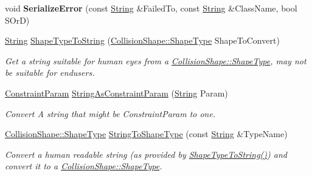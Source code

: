 \begin{DoxyCompactItemize}
\item 
\hypertarget{namespaceMezzanine_ad8e6c4e2c916816ff634c860cb0cf3f9}{
void {\bfseries SerializeError} (const \hyperlink{namespaceMezzanine_acf9fcc130e6ebf08e3d8491aebcf1c86}{String} \&FailedTo, const \hyperlink{namespaceMezzanine_acf9fcc130e6ebf08e3d8491aebcf1c86}{String} \&ClassName, bool SOrD)}
\label{namespaceMezzanine_ad8e6c4e2c916816ff634c860cb0cf3f9}

\item 
\hyperlink{namespaceMezzanine_acf9fcc130e6ebf08e3d8491aebcf1c86}{String} \hyperlink{namespaceMezzanine_a52369c62b87ecdbfbc6b82a572f21651}{ShapeTypeToString} (\hyperlink{classMezzanine_1_1CollisionShape_ad04186055565998879b64176d6dd100d}{CollisionShape::ShapeType} ShapeToConvert)
\begin{DoxyCompactList}\small\item\em Get a string suitable for human eyes from a \hyperlink{classMezzanine_1_1CollisionShape_ad04186055565998879b64176d6dd100d}{CollisionShape::ShapeType}, may not be suitable for endusers. \item\end{DoxyCompactList}\item 
\hyperlink{namespaceMezzanine_a6c62e8c2938fb203eb7a7072c12176f4}{ConstraintParam} \hyperlink{namespaceMezzanine_a198eb79806849ed29c2a329b60a094ab}{StringAsConstraintParam} (\hyperlink{namespaceMezzanine_acf9fcc130e6ebf08e3d8491aebcf1c86}{String} Param)
\begin{DoxyCompactList}\small\item\em Convert A string that might be ConstraintParam to one. \item\end{DoxyCompactList}\item 
\hyperlink{classMezzanine_1_1CollisionShape_ad04186055565998879b64176d6dd100d}{CollisionShape::ShapeType} \hyperlink{namespaceMezzanine_acae3fd66fbd56ed04a8d61bebee11769}{StringToShapeType} (const \hyperlink{namespaceMezzanine_acf9fcc130e6ebf08e3d8491aebcf1c86}{String} \&TypeName)
\begin{DoxyCompactList}\small\item\em Convert a human readable string (as provided by \hyperlink{namespaceMezzanine_a52369c62b87ecdbfbc6b82a572f21651}{ShapeTypeToString()}) and convert it to a \hyperlink{classMezzanine_1_1CollisionShape_ad04186055565998879b64176d6dd100d}{CollisionShape::ShapeType}. \item\end{DoxyCompactList}\item 

\end{DoxyCompactItemize}
